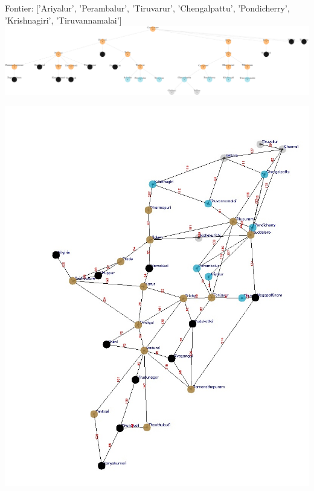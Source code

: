 \documentclass[xcolor=table]{beamer}
\begin{document}
\begin{frame}
  { \tiny Fontier: ['Ariyalur', 'Perambalur', 'Tiruvarur', 'Chengalpattu', 'Pondicherry', 'Krishnagiri', 'Tiruvannamalai']}
  \includegraphics[width=1\textwidth]{../BFSNodes/36-1.png}
  \begin{center}
    \includegraphics[height=0.6\textheight]{../BFSoutput/tamilBFS34.jpg}
  \end{center}
\end{frame}
\end{document}
